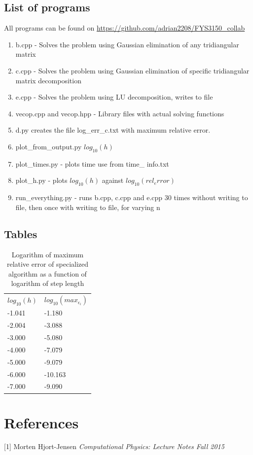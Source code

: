 \documentclass[10pt,a4paper]{article}
\begin{document}
\subsection{List of programs}
All programs can be found on \url{https://github.com/adrian2208/FYS3150_collab}
\begin{enumerate}
\item b.cpp - Solves the problem using Gaussian elimination of any tridiangular matrix
\item c.cpp - Solves the problem using Gaussian elimination of specific tridiangular matrix decomposition
\item e.cpp - Solves the problem using LU decomposition, writes to file
\item vecop.cpp and vecop.hpp - Library files with actual solving functions
\item d.py creates the file log\_err\_c.txt with maximum relative error.
\item plot\_from\_output.py $log_{10}(h)$
\item plot\_times.py - plots time use from time\_
info.txt
\item plot\_h.py - plots $log_{10}(h)$ against $log_{10}(rel_error)$
\item run\_everything.py - runs b.cpp, c.cpp and e.cpp 30 times without writing to file, then once with writing to file, for varying n
\end{enumerate}
\subsection{Tables}
\begin{table}[H]
\caption[Relative error of specialized algorithm]{Logarithm of maximum relative error of specialized algorithm as a function of logarithm of step length}
\begin{tabular}{ll}
$log_{10}(h)$ &  $log_{10}(max_{\epsilon_i})$ \\
 -1.041 & -1.180 \\
 -2.004 & -3.088 \\
 -3.000 & -5.080 \\
 -4.000 & -7.079 \\
 -5.000 & -9.079 \\
 -6.000 & -10.163 \\
 -7.000 & -9.090 

\end{tabular}
\end{table}

\section{References}
[1] Morten Hjort-Jensen \textit{Computational Physics: Lecture Notes Fall 2015}
\end{document}
